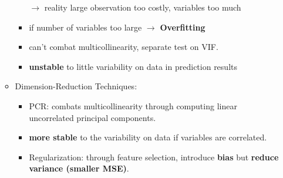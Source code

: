 \begin{itemize}
\begin{itemize}
\begin{itemize}
			$\rightarrow$ reality large observation too costly, variables too much
			\item if number of variables too large $\rightarrow$ \textbf{Overfitting}
			\item can't combat multicollinearity, separate test on VIF.
			\item \textbf{unstable} to little variability on data in prediction results
		\end{itemize}
		\item Dimension-Reduction Techniques:
		\begin{itemize}
			\item PCR: combats multicollinearity through computing linear uncorrelated principal components.
			\item \textbf{more stable} to the variability on data if variables are correlated.
			\item Regularization: through feature selection, introduce \textbf{bias} but \textbf{reduce variance (smaller MSE)}.  
		\end{itemize}
	\end{itemize}
\end{itemize}
